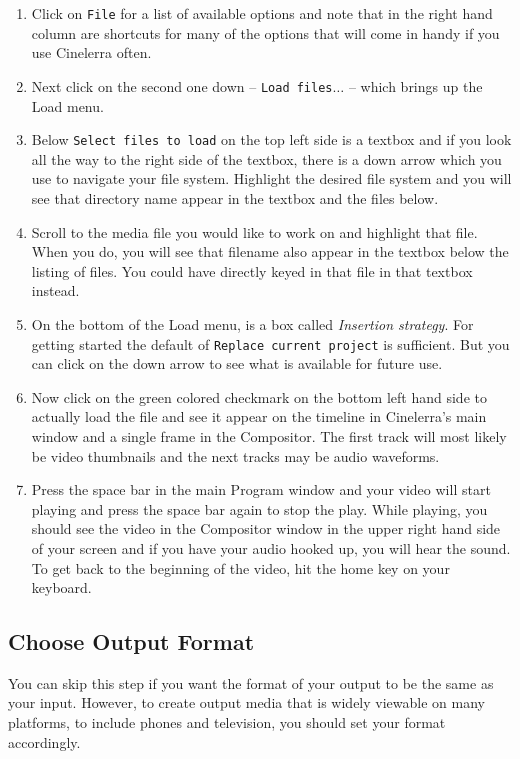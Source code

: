 \begin{enumerate}
	\item Click on \texttt{File} for a list of available options and note that in the right hand column are shortcuts for
	many of the options that will come in handy if you use Cinelerra often.
	\item Next click on the second one down -- \texttt{Load files$\dots$} -- which brings up the Load menu.
	\item Below \texttt{Select files to load} on the top left side is a textbox and if you look all the way to the right
	side of the textbox, there is a down arrow which you use to navigate your file system.  Highlight the
	desired file system and you will see that directory name appear in the textbox and the files below.
	\item Scroll to the media file you would like to work on and highlight that file.  When you do, you will
	see that filename also appear in the textbox below the listing of files.  You could have directly
	keyed in that file in that textbox instead.
	\item On the bottom of the Load menu, is a box called \textit{Insertion strategy}.  For getting started the
	default of \texttt{Replace current project} is sufficient.  But you can click on the down arrow to see what
	is available for future use.
	\item Now click on the green colored checkmark on the bottom left hand side to actually load the file
	and see it appear on the timeline in Cinelerra’s main window and a single frame in the Compositor.
	The first track will most likely be video thumbnails and the next tracks may be audio waveforms.
	\item Press the space bar in the main Program window and your video will start playing and press the
	space bar again to stop the play.  While playing, you should see the video in the Compositor
	window in the upper right hand side of your screen and if you have your audio hooked up, you
	will hear the sound.  To get back to the beginning of the video, hit the home key on your keyboard.
\end{enumerate}

\subsection{Choose Output Format}%
\label{sub:choose_output_format}
	
You can skip this step if you want the format of your output to be the same as your input.  However, to create output media that is widely viewable on many platforms, to include phones and television, you should set your format accordingly.

